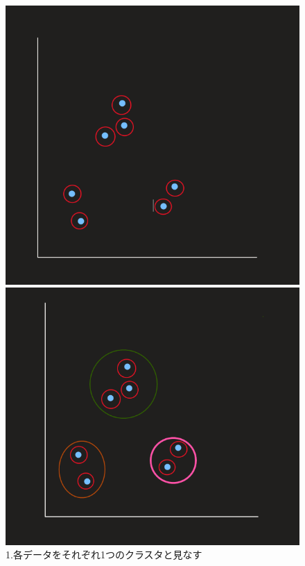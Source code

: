 \documentclass[dvipdfmx]{jsarticle}
\begin{document}
\begin{figure}[H]
 \begin{minipage}{0.5\hsize}
  \begin{center}
   \includegraphics[scale=0.3]{images/gyousyu01.png}
  \end{center}
  \caption{1.各データをそれぞれ1つのクラスタと見なす}
  \label{fig:one}
 \end{minipage}
 \begin{minipage}{0.3\hsize}
  \begin{center}
   \includegraphics[scale=0.3]{images/gyousyu02.png}

\end{center}
\end{minipage}
\end{figure}
\end{document}
